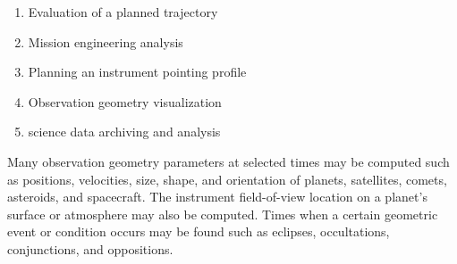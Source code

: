 \documentclass[crop=false,class=book]{standalone}
\begin{document}
            \begin{enumerate}
                \item Evaluation of a planned trajectory
                \item Mission engineering analysis
                \item Planning an instrument pointing profile
                \item Observation geometry visualization
                \item science data archiving and analysis
            \end{enumerate}
            Many observation geometry parameters at selected times may be computed such as positions, velocities, size, shape, and orientation of planets, satellites, comets, asteroids, and spacecraft. The instrument field-of-view location on a planet's surface or atmosphere may also be computed. Times when a certain geometric event or condition occurs may be found such as eclipses, occultations, conjunctions, and oppositions.
\end{document}

